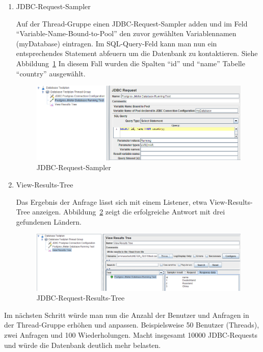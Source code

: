 \documentclass[a4paper,12pt]{article}
\begin{document}
\begin{enumerate}
	\item JDBC-Request-Sampler
	
	Auf der Thread-Gruppe einen JDBC-Request-Sampler adden und im Feld "`Variable-Name-Bound-to-Pool"' den zuvor gewählten Variablennamen (myDatabase) eintragen.  
	Im SQL-Query-Feld kann man nun ein entsprechendes Statement abfeuern um die Datenbank zu kontaktieren. Siehe Abbildung~\ref{fig:jdbc_request} In diesem Fall wurden die Spalten "`id"' und "`name"' Tabelle "`country"' ausgewählt.
	
	\begin{figure}[htb]%
 \centering
    \includegraphics[width=1\textwidth]{bilder/jdbc_request.png}
  \caption{JDBC-Request-Sampler}
  \label{fig:jdbc_request}
\end{figure}
	
	\item View-Results-Tree
	
	Das Ergebnis der Anfrage lässt sich mit einem Listener, etwa View-Results-Tree anzeigen. Abbildung~\ref{fig:jdbc_results} zeigt die erfolgreiche Antwort mit drei gefundenen Ländern.
		
			\begin{figure}[htb]%
 \centering
    \includegraphics[width=1\textwidth]{bilder/jdbc_results.png}
  \caption{JDBC-Request-Results-Tree}
  \label{fig:jdbc_results}
\end{figure}
\end{enumerate}

Im nächsten Schritt würde man nun die Anzahl der Benutzer und Anfragen in der Thread-Gruppe erhöhen und anpassen. Beispielsweise 50 Benutzer (Threads), zwei Anfragen und 100 Wiederholungen. Macht insgesamt 10000 JDBC-Requests und würde die Datenbank deutlich mehr belasten.
\end{document}
